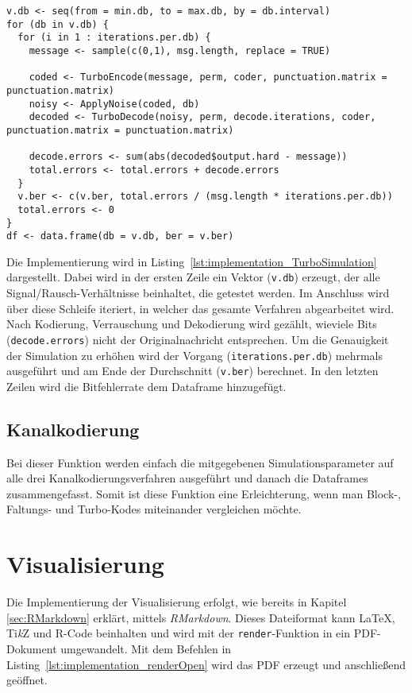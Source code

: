 \begin{lstlisting}[caption=Implementierung von \texttt{TurboSimulation}, label={lst:implementation_TurboSimulation}, float=!th]
v.db <- seq(from = min.db, to = max.db, by = db.interval)
for (db in v.db) {
  for (i in 1 : iterations.per.db) {
    message <- sample(c(0,1), msg.length, replace = TRUE)
    
    coded <- TurboEncode(message, perm, coder, punctuation.matrix = punctuation.matrix)
    noisy <- ApplyNoise(coded, db)
    decoded <- TurboDecode(noisy, perm, decode.iterations, coder, punctuation.matrix = punctuation.matrix)
                             
    decode.errors <- sum(abs(decoded$output.hard - message))
    total.errors <- total.errors + decode.errors
  }
  v.ber <- c(v.ber, total.errors / (msg.length * iterations.per.db))
  total.errors <- 0
}
df <- data.frame(db = v.db, ber = v.ber)
\end{lstlisting}

Die Implementierung wird in Listing~\ref{lst:implementation_TurboSimulation} dargestellt. Dabei wird in der ersten Zeile ein Vektor (\texttt{v.db}) erzeugt, der alle Signal/Rausch-Verhältnisse beinhaltet, die getestet werden. Im Anschluss wird über diese Schleife iteriert, in welcher das gesamte Verfahren abgearbeitet wird. Nach Kodierung, Verrauschung und Dekodierung wird gezählt, wieviele Bits (\texttt{decode.errors}) nicht der Originalnachricht entsprechen. Um die Genauigkeit der Simulation zu erhöhen wird der Vorgang (\texttt{iterations.per.db}) mehrmals ausgeführt und am Ende der Durchschnitt (\texttt{v.ber}) berechnet. In den letzten Zeilen wird die Bitfehlerrate dem Dataframe hinzugefügt.

\FloatBarrier
\subsection{Kanalkodierung}
\label{sec:implementation_channelcoding}
Bei dieser Funktion werden einfach die mitgegebenen Simulationsparameter auf alle drei Kanalkodierungsverfahren ausgeführt und danach die Dataframes zusammengefasst. Somit ist diese Funktion eine Erleichterung, wenn man Block-, Faltungs- und Turbo-Kodes miteinander vergleichen möchte.

\FloatBarrier
\section{Visualisierung}
\label{sec:implementation_visualization}
Die Implementierung der Visualisierung erfolgt, wie bereits in Kapitel \ref{sec:RMarkdown} erklärt, mittels \emph{RMarkdown}. Dieses Dateiformat kann \LaTeX , Ti\textit{k}Z und R-Code beinhalten und wird mit der \texttt{render}-Funktion in ein PDF-Dokument umgewandelt. Mit dem Befehlen in Listing~\ref{lst:implementation_renderOpen} wird das PDF erzeugt und anschließend geöffnet.

